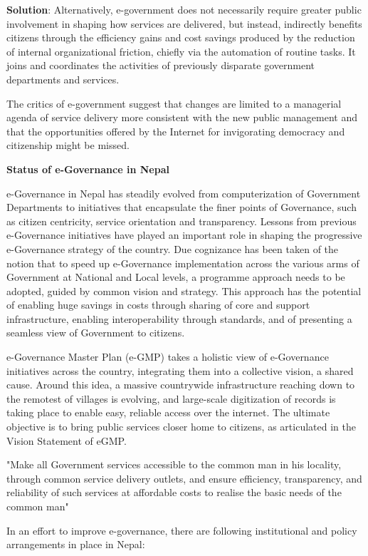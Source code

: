 \documentclass[
  openany]{book}
\newenvironment{solution}{ {\bfseries Solution}:}{}
\begin{document}
\begin{questions}
\begin{solution}
Alternatively, e-government does not necessarily require greater public involvement in shaping how services are delivered, but instead, indirectly benefits citizens through the efficiency gains and cost savings produced by the reduction of internal organizational friction, chiefly via the automation of routine tasks. It joins and coordinates the activities of previously disparate government departments and services.

The critics of e-government suggest that changes are limited to a managerial agenda of service delivery more consistent with the new public management and that the opportunities offered by the Internet for invigorating democracy and citizenship might be missed.

\textbf{Status of e-Governance in Nepal}

e-Governance in Nepal has steadily evolved from computerization of Government Departments to initiatives that encapsulate the finer points of Governance, such as citizen centricity, service orientation and transparency. Lessons from previous e-Governance initiatives have played an important role in shaping the progressive e-Governance strategy of the country. Due cognizance has been taken of the notion that to speed up e-Governance implementation across the various arms of Government at National and Local levels, a programme approach needs to be adopted, guided by common vision and strategy. This approach has the potential of enabling huge savings in costs through sharing of core and support infrastructure, enabling interoperability through standards, and of presenting a seamless view of Government to citizens.

e-Governance Master Plan (e-GMP) takes a holistic view of e-Governance initiatives across the country, integrating them into a collective vision, a shared cause. Around this idea, a massive countrywide infrastructure reaching down to the remotest of villages is evolving, and large-scale digitization of records is taking place to enable easy, reliable access over the internet. The ultimate objective is to bring public services closer home to citizens, as articulated in the Vision Statement of eGMP.

"Make all Government services accessible to the common man in his locality, through common service delivery outlets, and ensure efficiency, transparency, and reliability of such services at affordable costs to realise the basic needs of the common man"

In an effort to improve e-governance, there are following institutional and policy arrangements in place in Nepal:


\end{solution}
\end{questions}
\end{document}
